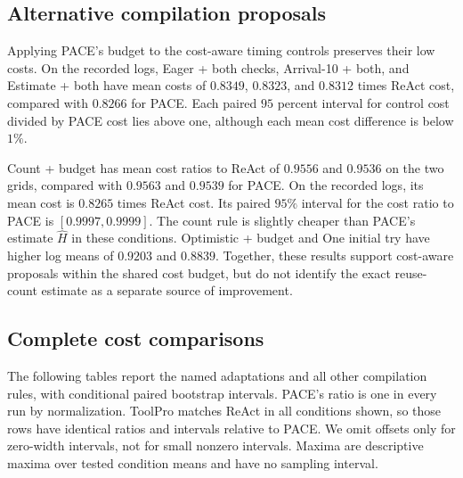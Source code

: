 \subsection{Alternative compilation proposals}
\label{sec:matched-budget}

Applying PACE's budget to the cost-aware timing controls preserves their low costs.
On the recorded logs, Eager + both checks, Arrival-10 + both, and Estimate + both have mean costs of $0.8349$, $0.8323$, and $0.8312$ times ReAct cost, compared with $0.8266$ for PACE.
Each paired $95$ percent interval for control cost divided by PACE cost lies above one, although each mean cost difference is below $1\%$.

Count + budget has mean cost ratios to ReAct of $0.9556$ and $0.9536$ on the two grids, compared with $0.9563$ and $0.9539$ for PACE.
On the recorded logs, its mean cost is $0.8265$ times ReAct cost.
Its paired $95\%$ interval for the cost ratio to PACE is $[0.9997,0.9999]$.
The count rule is slightly cheaper than PACE's estimate $\hat H$ in these conditions.
Optimistic + budget and One initial try have higher log means of $0.9203$ and $0.8839$.
Together, these results support cost-aware proposals within the shared cost budget, but do not identify the exact reuse-count estimate as a separate source of improvement.

\subsection{Complete cost comparisons}
\label{app:full-comparisons}
The following tables report the named adaptations and all other compilation rules, with conditional paired bootstrap intervals.
PACE's ratio is one in every run by normalization.
ToolPro matches ReAct in all conditions shown, so those rows have identical ratios and intervals relative to PACE.
We omit offsets only for zero-width intervals, not for small nonzero intervals.
Maxima are descriptive maxima over tested condition means and have no sampling interval.


